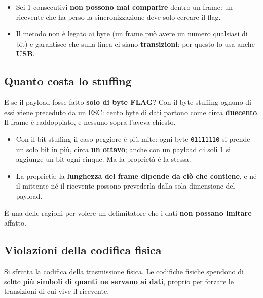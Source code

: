 \begin{itemize}
    \item Sei 1 consecutivi \textbf{non possono mai comparire} dentro un frame: un ricevente che ha perso la sincronizzazione deve solo
          cercare il flag.
    \item Il metodo non è legato ai byte (un frame può avere un numero qualsiasi di bit) e garantisce che sulla linea ci siano
          \textbf{transizioni}: per questo lo usa anche \textbf{USB}.
\end{itemize}

\subsection{Quanto costa lo stuffing}

E se il payload fosse fatto \textbf{solo di byte FLAG}? Con il byte stuffing ognuno di essi viene preceduto da un ESC: cento byte di
dati partono come circa \textbf{duecento}. Il frame è raddoppiato, e nessuno sopra l'aveva chiesto.

\begin{itemize}
    \item Con il bit stuffing il caso peggiore è più mite: ogni byte \texttt{01111110} si prende un solo bit in più, circa
          \textbf{un ottavo}; anche con un payload di soli 1 si aggiunge un bit ogni cinque. Ma la proprietà è la stessa.
    \item La proprietà: la \textbf{lunghezza del frame dipende da ciò che contiene}, e né il mittente né il ricevente possono prevederla
          dalla sola dimensione del payload.
\end{itemize}

È una delle ragioni per volere un delimitatore che i dati \textbf{non possano imitare} affatto.

\subsection{Violazioni della codifica fisica}

Si sfrutta la codifica della trasmissione fisica. Le codifiche fisiche spendono di solito \textbf{più simboli di quanti ne
servano ai dati}, proprio per forzare le transizioni di cui vive il ricevente.

